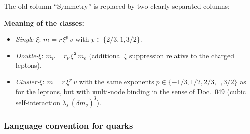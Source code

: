 The old column \enquote{Symmetry} is replaced by two clearly
separated columns:

\begin{center}
{\footnotesize
{}
}
\end{center}

\textbf{Meaning of the classes:}
\begin{itemize}
  \item \emph{Single-$\xi$}: $m = r\,\xi^p\,v$ with $p \in \{2/3, 1, 3/2\}$.
  \item \emph{Double-$\xi$}: $m_\nu = r_\nu\,\xi^2\,m_e$
        (additional $\xi$ suppression relative to the charged leptons).
  \item \emph{Cluster-$\xi$}: $m = r\,\xi^p\,v$ with the same exponents
        $p \in \{-1/3, 1/2, 2/3, 1, 3/2\}$ as for the leptons, but with
        multi-node binding in the sense of Doc.~049 (cubic
        self-interaction $\lambda_s\,(\delta m_q)^3$).
\end{itemize}

\subsubsection*{Language convention for quarks}

